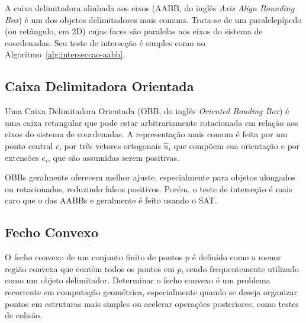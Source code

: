 A caixa delimitadora alinhada aos eixos (AABB, do inglês \textit{Axis Align Bounding Box}) é um dos objetos delimitadores mais comuns. Trata-se de um paralelepípedo (ou retângulo, em 2D) cujas faces são paralelas aos eixos do sistema de coordenadas. Seu teste de interseção é simples como no Algoritmo~\ref{alg:interseccao-aabb}.
\begin{algorithm}[htb]
	\caption{Teste de Intersecção AABB}
	
	\label{alg:interseccao-aabb}
\end{algorithm}

\subsection*{Caixa Delimitadora Orientada}

Uma Caixa Delimitadora Orientada (OBB, do inglês \textit{Oriented Bouding Box}) é uma caixa retangular que pode estar arbitrariamente rotacionada em relação aos eixos do sistema de coordenadas. A representação mais comum é feita por um ponto central $c$, por três vetores ortogonais $\hat{u}_i$ que compõem sua orientação e por extensões $e_i$, que são assumidas serem positivas.

OBBs geralmente oferecem melhor ajuste, especialmente para objetos alongados ou rotacionados, reduzindo falsos positivos. Porém, o teste de interseção é mais caro que o das AABBs e geralmente é feito usando o SAT.

\subsection*{Fecho Convexo}

O fecho convexo de um conjunto finito de pontos $p$ é definido como a menor região convexa que contém todos os pontos em $p$, sendo frequentemente utilizado como um objeto delimitador. Determinar o fecho convexo é um problema recorrente em computação geométrica, especialmente quando se deseja organizar pontos em estruturas mais simples ou acelerar operações posteriores, como testes de colisão.

